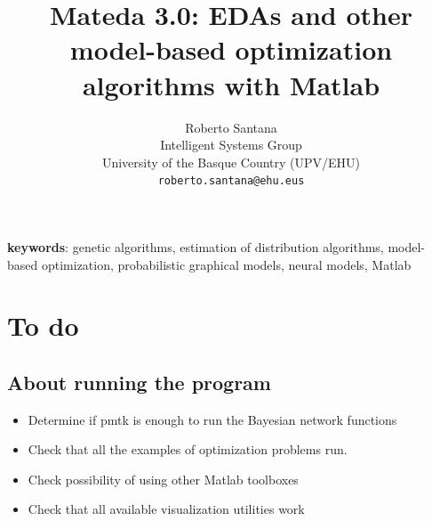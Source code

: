 \documentclass{article} %
\title{Mateda 3.0: EDAs and other model-based optimization algorithms with Matlab}
\author{
Roberto Santana \\
Intelligent Systems Group\\
University of the Basque Country (UPV/EHU)\\
\texttt{roberto.santana@ehu.eus} 
}
\begin{document}
\maketitle

\begin{abstract}
  
   


\end{abstract}


{\bf{keywords}}:  genetic algorithms, estimation of distribution algorithms, model-based optimization, probabilistic graphical models, neural models, Matlab






\section{To do}


\subsection{About running the program}
\begin{itemize}
  \item Determine if pmtk is enough to run the Bayesian network  functions
  \item Check that all the examples of optimization problems run.
  \item Check possibility of using other Matlab toolboxes
  \item Check that all available visualization utilities work
 \end{itemize}
\end{document}
